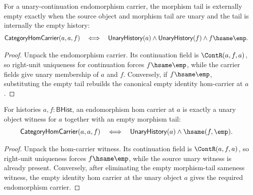 \begin{theorem}
\label{thm:category-hom-carrier-endomorphism-tail-empty}
For a unary-continuation endomorphism carrier, the morphism tail is externally
empty exactly when the source object and morphism tail are unary and the tail is
internally the empty history:
$$
\mathsf{CategoryHomCarrier}(a,a,f)
\quad\Longleftrightarrow\quad
\mathsf{UnaryHistory}(a)\wedge\mathsf{UnaryHistory}(f)\wedge f\hsame\emp.
$$
\end{theorem}
\begin{proof}
Unpack the endomorphism carrier. Its continuation field is
\(\ContR(a,f,a)\), so right-unit uniqueness for continuation forces
\(f\hsame\emp\), while the carrier fields give unary membership of \(a\) and
\(f\). Conversely, if \(f\hsame\emp\), substituting the empty tail rebuilds
the canonical empty identity hom-carrier at \(a\).
\end{proof}

\begin{theorem}
\label{thm:category-hom-carrier-endomorphism-empty-iff}
For histories $a,f:\mathsf{BHist}$, an endomorphism hom carrier at $a$ is
exactly a unary object witness for $a$ together with an empty morphism tail:
$$
\mathsf{CategoryHomCarrier}(a,a,f)
\quad\Longleftrightarrow\quad
\mathsf{UnaryHistory}(a)\wedge\hsame(f,\emp).
$$
\end{theorem}
\begin{proof}
Unpack the hom-carrier witness. Its continuation field is
$\ContR(a,f,a)$, so right-unit uniqueness forces $f\hsame\emp$, while the
source unary witness is already present. Conversely, after eliminating the
empty morphism-tail sameness witness, the empty identity hom carrier at the
unary object $a$ gives the required endomorphism carrier.
\end{proof}
